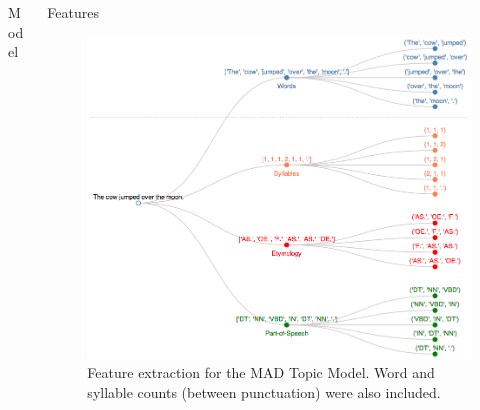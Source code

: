 \documentclass[final]{beamer}
\newlength{\onecolwid}
\newlength{\twocolwid}
\begin{document}
\begin{frame}[t]
\begin{columns}[t]
\begin{column}{\twocolwid}
\begin{columns}[t,totalwidth=\twocolwid]
\begin{column}{\onecolwid}
\begin{block}{Model}
\end{block}


\end{column} %

\begin{column}{\onecolwid}\vspace{-.6in} %


\begin{block}{Features}

\begin{figure}
\centering
\includegraphics[width=\linewidth]{dendrogram.png}
\caption{Feature extraction for the MAD Topic Model. Word and syllable counts (between punctuation) were also included.}
\end{figure}

\end{block}


\end{column} %

\end{columns} %


\end{column}
\end{columns}
\end{frame}
\end{document}
